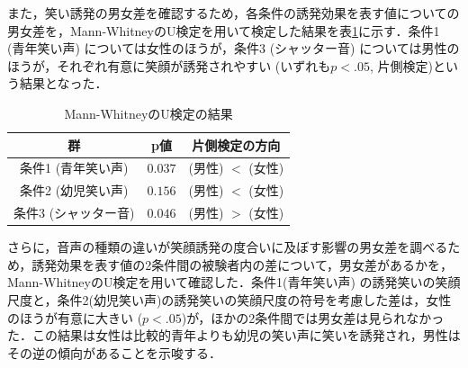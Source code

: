\documentclass[report,10pt,uplatex,titlepage]{jsarticle}
\begin{document}
また，笑い誘発の男女差を確認するため，各条件の誘発効果を表す値についての男女差を，Mann-WhitneyのU検定を用いて検定した結果を表\ref{manw}に示す．条件1 (青年笑い声) については女性のほうが，条件3 (シャッター音) については男性のほうが，それぞれ有意に笑顔が誘発されやすい (いずれも$p<.05$, 片側検定)という結果となった．

\begin{table}[htb]
  \begin{center}
    \caption{Mann-WhitneyのU検定の結果}
    \begin{tabular}{|c|c|c|}  \hline
      群 & p値 & 片側検定の方向 \\ \hline \hline
      条件1 (青年笑い声) & $0.037$ & (男性) $<$ (女性) \\ \hline
      条件2 (幼児笑い声)  & $0.156$ & (男性) $<$ (女性) \\ \hline
      条件3 (シャッター音) & $0.046$ & (男性) $>$ (女性) \\ \hline
    \end{tabular}
    \label{manw}
  \end{center}
\end{table}


さらに，音声の種類の違いが笑顔誘発の度合いに及ぼす影響の男女差を調べるため，誘発効果を表す値の2条件間の被験者内の差について，男女差があるかを，Mann-WhitneyのU検定を用いて確認した．条件1(青年笑い声) の誘発笑いの笑顔尺度と，条件2(幼児笑い声)の誘発笑いの笑顔尺度の符号を考慮した差は，女性のほうが有意に大きい ($p<.05$)が，ほかの2条件間では男女差は見られなかった．この結果は女性は比較的青年よりも幼児の笑い声に笑いを誘発され，男性はその逆の傾向があることを示唆する．


\end{document}
